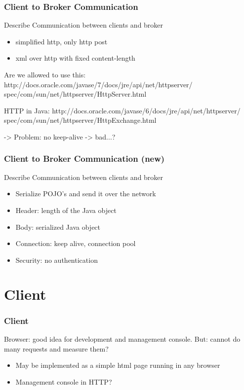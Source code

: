 \documentclass{beamer}
\begin{document}
\begin{frame}
\frametitle{Client to Broker Communication}

Describe Communication between clients and broker
\begin{itemize}
\item simplified http, only http post
\item xml over http with fixed content-length
\end{itemize}

Are we allowed to use this:
http://docs.oracle.com/javase/7/docs/jre/api/net/httpserver/
spec/com/sun/net/httpserver/HttpServer.html

HTTP in Java:
http://docs.oracle.com/javase/6/docs/jre/api/net/httpserver/
spec/com/sun/net/httpserver/HttpExchange.html

-> Problem: no keep-alive -> bad...?
\end{frame}


\begin{frame}
\frametitle{Client to Broker Communication (new)}

Describe Communication between clients and broker
\begin{itemize}
\item Serialize POJO's and send it over the network
\item Header: length of the Java object
\item Body: serialized Java object
\item Connection: keep alive, connection pool
\item Security: no authentication
\end{itemize}
\end{frame}


\section{Client}
\begin{frame}
\frametitle{Client}
Browser: good idea for development and management console.
But: cannot do many requests and measure them?
\begin{itemize}
\item May be implemented as a simple html page running in any browser
\item Management console in HTTP?
\end{itemize}
\end{frame}
\end{document}
